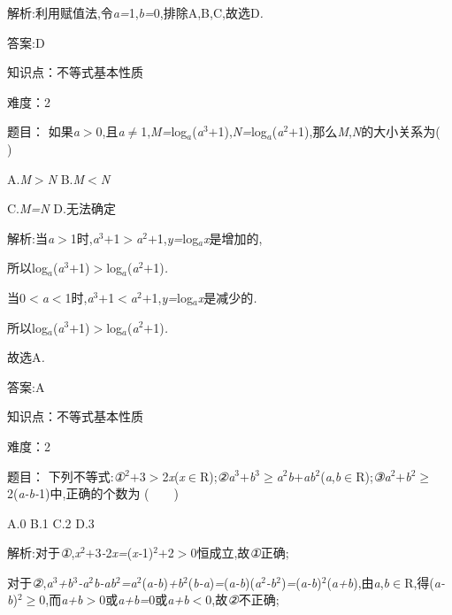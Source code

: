 \documentclass{article} %
\begin{document}
 解析:利用赋值法,令\textit{a=}1,\textit{b=}0,排除A,B,C,故选D\textit{.}

 答案:D

知识点：不等式基本性质

难度：2

 题目： 如果\textit{a$>$}0,且\textit{a}$\mathrm{\neq}$1,\textit{M=}log\textit{${}_{a}$}(\textit{a}${}^{3}$\textit{$+$}1),\textit{N=}log\textit{${}_{a}$}(\textit{a}${}^{2}$\textit{$+$}1),那么\textit{M},\textit{N}的大小关系为(\textit{　　})

 A.\textit{M$>$N} B.\textit{M$<$N}

 C.\textit{M=N} D.无法确定


 解析:当\textit{a$>$}1时,\textit{a}${}^{3}$\textit{$+$}1\textit{$>$a}${}^{2}$\textit{$+$}1,\textit{y=}log\textit{${}_{a}$x}是增加的,

所以log\textit{${}_{a}$}(\textit{a}${}^{3}$\textit{$+$}1)\textit{$>$}log\textit{${}_{a}$}(\textit{a}${}^{2}$\textit{$+$}1)\textit{.}

当0\textit{$<$a$<$}1时,\textit{a}${}^{3}$\textit{$+$}1\textit{$<$a}${}^{2}$\textit{$+$}1,\textit{y=}log\textit{${}_{a}$x}是减少的\textit{.}

所以log\textit{${}_{a}$}(\textit{a}${}^{3}$\textit{$+$}1)\textit{$>$}log\textit{${}_{a}$}(\textit{a}${}^{2}$\textit{$+$}1)\textit{.}

故选A\textit{.}

 答案:A

知识点：不等式基本性质

难度：2

 题目： 下列不等式:\textit{①}${}^{2}$\textit{$+$}3\textit{$>$}2\textit{x}(\textit{x}$\mathrm{\in}$R);\textit{②a}${}^{3}$\textit{$+$b}${}^{3}$$\mathrm{\ge}$\textit{a}${}^{2}$\textit{b$+$ab}${}^{2}$(\textit{a},\textit{b}$\mathrm{\in}$R);\textit{③}\textit{a}${}^{2}$\textit{$+$b}${}^{2}$$\mathrm{\ge}$2(\textit{a-b-}1)中,正确的个数为 (\textit{　　})

 A.0 B.1 C.2 D.3

 解析:对于\textit{①},\textit{x}${}^{2}$\textit{$+$}3\textit{-}2\textit{x=}(\textit{x-}1)${}^{2}$\textit{$+$}2\textit{$>$}0恒成立,故\textit{①}正确;

对于\textit{②},\textit{a}${}^{3}$\textit{+b}${}^{3}$\textit{-a}${}^{2}$\textit{b-ab}${}^{2}$\textit{=a}${}^{2}$(\textit{a-b})\textit{+b}${}^{2}$(\textit{b-a})\textit{=}(\textit{a-b})(\textit{a}${}^{2}$\textit{-b}${}^{2}$)\textit{=}(\textit{a-b})${}^{2}$(\textit{a+b}),由\textit{a},\textit{b}$\mathrm{\in}$R,得(\textit{a-b})${}^{2}$$\mathrm{\ge}$0,而\textit{a+b$>$}0或\textit{a+b=}0或\textit{a+b$<$}0,故\textit{②}不正确;
\end{document}
